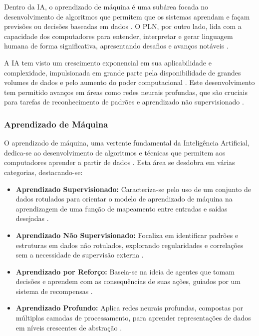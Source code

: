 \documentclass[conference]{IEEEtran}
\begin{document}
Dentro da IA, o aprendizado de máquina é uma subárea focada no desenvolvimento de 
algoritmos que permitem que os sistemas aprendam e 
façam previsões ou decisões baseadas em dados \cite{Alpaydin2020}. 
O PLN, por outro lado, lida com a capacidade dos computadores para entender, 
interpretar e gerar linguagem humana de forma significativa, 
apresentando desafios e avanços notáveis \cite{Jurafsky2020}.

A IA tem visto um crescimento exponencial em sua aplicabilidade e complexidade, 
impulsionada em grande parte pela disponibilidade de grandes volumes de dados e 
pelo aumento do poder computacional \cite{Goodfellow2016}. 
Este desenvolvimento tem permitido avanços em áreas como redes neurais profundas, 
que são cruciais para tarefas de reconhecimento de padrões 
e aprendizado não supervisionado \cite{LeCun2015}.

\subsubsection{Aprendizado de Máquina} 

O aprendizado de máquina, uma vertente fundamental da Inteligência Artificial, 
dedica-se ao desenvolvimento de algoritmos e técnicas que permitem aos computadores 
aprender a partir de dados \cite{Bishop2006}. 
Esta área se desdobra em várias categorias, destacando-se:

\begin{itemize}
\item {\textbf{Aprendizado Supervisionado:}}
Caracteriza-se pelo uso de um conjunto de dados rotulados para orientar o modelo 
de aprendizado de máquina na aprendizagem de uma função de mapeamento entre 
entradas e saídas desejadas \cite{Mohri2018}.
\item {\textbf{Aprendizado Não Supervisionado:}}
Focaliza em identificar padrões e estruturas em dados não rotulados, 
explorando regularidades e correlações sem a necessidade de supervisão externa \cite{Hinton2006}.
\item {\textbf{Aprendizado por Reforço:}}
Baseia-se na ideia de agentes que tomam decisões e aprendem com 
as consequências de suas ações, guiados por um sistema de recompensas \cite{Sutton2018}.
\item {\textbf{Aprendizado Profundo:}}
Aplica redes neurais profundas, compostas por múltiplas camadas de processamento, 
para aprender representações de dados em níveis crescentes de abstração \cite{LeCun2015}.
\end{itemize}
\end{document}
